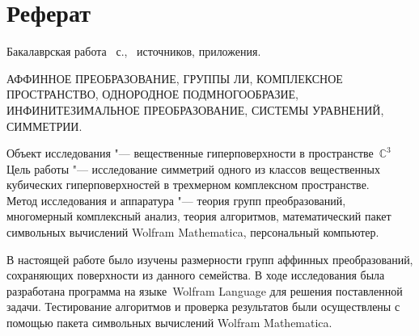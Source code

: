 \documentclass[../main.tex]{subfiles}
\begin{document}
\newpage
\section*{\centering Реферат}

\begin{flushleft}
Бакалаврская работа ~с., \ источников,  приложения.\\
\vspace{0.5cm}

АФФИННОЕ ПРЕОБРАЗОВАНИЕ, ГРУППЫ ЛИ, КОМПЛЕКСНОЕ ПРОСТРАНСТВО, ОДНОРОДНОЕ ПОДМНОГООБРАЗИЕ, ИНФИНИТЕЗИМАЛЬНОЕ ПРЕОБРАЗОВАНИЕ, СИСТЕМЫ УРАВНЕНИЙ, СИММЕТРИИ.

\vspace{0.5cm}
Объект исследования "--- вещественные гиперповерхности в пространстве~$\mathbb{C}^3$\\
\vspace{0.5cm}
Цель работы "--- исследование симметрий одного из классов вещественных кубических гиперповерхностей в трехмерном комплексном пространстве.\\
\vspace{0.5cm}
Метод исследования и аппаратура "--- теория групп преобразований, многомерный комплексный анализ, теория алгоритмов, математический пакет символьных вычислений {\ttfamily Wolfram Mathematica}, персональный компьютер.\\
\vspace{0.5cm}

В настоящей работе было изучены размерности групп аффинных преобразований, сохраняющих поверхности из данного семейства. В ходе исследования была разработана программа на языке~{\ttfamily Wolfram Language} для решения поставленной задачи. Тестирование алгоритмов и проверка результатов были осуществлены с помощью пакета символьных вычислений {\ttfamily Wolfram Mathematica}.

\end{flushleft}
\clearpage
\normalsize
\end{document}
